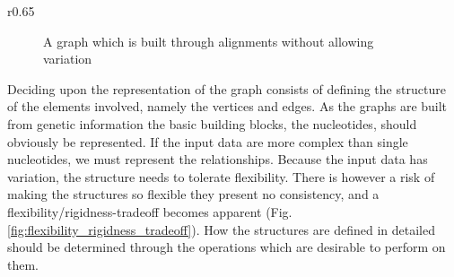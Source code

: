 \documentclass[thesis.tex]{subfiles}
\begin{document}
\begin{wrapfigure}{r}{0.65\textwidth}
\begin{mdframed}
\begin{subfigure}[t]{\textwidth}
\begin{mdframed}
\begin{center}
        \end{center}
      \end{mdframed}
      \caption{A graph which is built through alignments without allowing variation}
    \end{subfigure}
  \end{mdframed}
  \caption{Two sequence graphs displaying too much flexibility (a) and (arguably) too much rigidity (b)}
  \label{fig:flexibility_rigidness_tradeoff}
\end{wrapfigure}
Deciding upon the representation of the graph consists of defining the structure of the elements involved, namely the vertices and edges. As the graphs are built from genetic information the basic building blocks, the nucleotides, should obviously be represented. If the input data are more complex than single nucleotides, we must represent the relationships. Because the input data has variation, the structure needs to tolerate flexibility. There is however a risk of making the structures so flexible they present no consistency, and a flexibility/rigidness-tradeoff becomes apparent (Fig. \ref{fig:flexibility_rigidness_tradeoff}). How the structures are defined in detailed should be determined through the operations which are desirable to perform on them.
\end{document}
